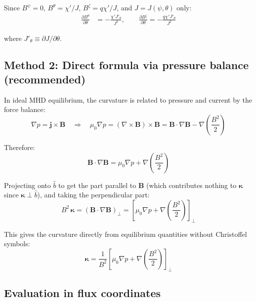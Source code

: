 \documentclass[12pt,a4paper]{article}
\begin{document}
Since $B^\psi = 0$, $B^\theta = \chi'/J$, $B^\zeta = q\chi'/J$, and $J = J(\psi,\theta)$ only:
\begin{align}
    \frac{\partial B^\theta}{\partial\theta} &= -\frac{\chi' J'_\theta}{J^2}, \qquad
    \frac{\partial B^\zeta}{\partial\theta} = -\frac{q\chi' J'_\theta}{J^2}
    \label{eq:dBdth}
\end{align}

where $J'_\theta \equiv \partial J/\partial\theta$.

\subsection{Method 2: Direct formula via pressure balance (recommended)}

In ideal MHD equilibrium, the curvature is related to pressure and current by the force balance:
\begin{equation}
    \nabla p = \mathbf{j}\times\mathbf{B}
    \quad\Longrightarrow\quad
    \mu_0\nabla p = (\nabla\times\mathbf{B})\times\mathbf{B}
    = \mathbf{B}\cdot\nabla\mathbf{B} - \nabla\!\left(\frac{B^2}{2}\right)
\end{equation}

Therefore:
\begin{equation}
    \mathbf{B}\cdot\nabla\mathbf{B} = \mu_0\nabla p + \nabla\!\left(\frac{B^2}{2}\right)
    \label{eq:BdotgradB_equil}
\end{equation}

Projecting onto $\hat{b}$ to get the part parallel to $\mathbf{B}$ (which contributes nothing to $\bm{\kappa}$ since $\bm{\kappa}\perp\hat{b}$), and taking the perpendicular part:
\begin{equation}
    B^2\,\bm{\kappa} = \left(\mathbf{B}\cdot\nabla\mathbf{B}\right)_\perp
    = \left[\mu_0\nabla p + \nabla\!\left(\frac{B^2}{2}\right)\right]_\perp
    \label{eq:kappa_equil}
\end{equation}

This gives the curvature directly from equilibrium quantities without Christoffel symbols:
\begin{equation}
    \boxed{
    \bm{\kappa} = \frac{1}{B^2}\left[\mu_0\nabla p + \nabla\!\left(\frac{B^2}{2}\right)\right]_\perp
    }
    \label{eq:kappa_pressure}
\end{equation}

\subsection{Evaluation in flux coordinates}
\end{document}
